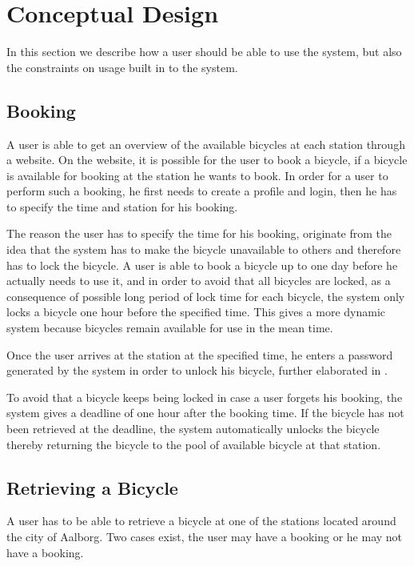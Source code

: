 \section{Conceptual Design}
In this section we describe how a user should be able to use the system, but also the constraints on usage built in to the system.

\subsection{Booking}
A user is able to get an overview of the available bicycles at each station through a website. 
On the website, it is possible for the user to book a bicycle, if a bicycle is available for booking at the station he wants to book. 
In order for a user to perform such a booking, he first needs to create a profile and login, then he has to specify the time and station for his booking.

The reason the user has to specify the time for his booking, originate from the idea that the system has to make the bicycle unavailable to others and therefore has to lock the bicycle.
A user is able to book a bicycle up to one day before he actually needs to use it, and in order to avoid that all bicycles are locked, as a consequence of possible long period of lock time for each bicycle, the system only locks a bicycle one hour before the specified time.
This gives a more dynamic system because bicycles remain available for use in the mean time.

Once the user arrives at the station at the specified time, he enters a password generated by the system in order to unlock his bicycle, further elaborated in .

To avoid that a bicycle keeps being locked in case a user forgets his booking, the system gives a deadline of one hour after the booking time.
If the bicycle has not been retrieved at the deadline, the system automatically unlocks the bicycle thereby returning the bicycle to the pool of available bicycle at that station. 

\subsection{Retrieving a Bicycle}\label{sec:conceptretrieveandshit}
A user has to be able to retrieve a bicycle at one of the stations located around the city of Aalborg.
Two cases exist, the user may have a booking or he may not have a booking.


